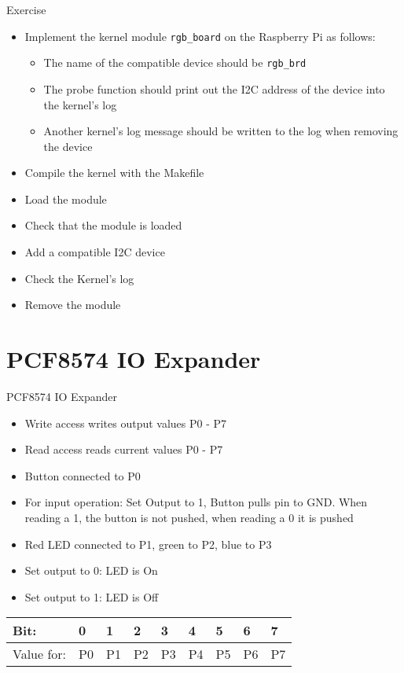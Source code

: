 \documentclass[aspectratio=169]{beamer}
\begin{document}
\begin{frame}{Exercise}
	\begin{itemize}	
		\item Implement the kernel module \lstinline|rgb_board| on the Raspberry Pi as follows:
			\begin{itemize}
				\item The name of the compatible device should be \lstinline|rgb_brd|
				\item The probe function should print out the I2C address of the device into the kernel's log
				\item Another kernel's log message should be written to the log when removing the device
			\end{itemize}
		\item Compile the kernel with the Makefile
		\item Load the module
		\item Check that the module is loaded
		\item Add a compatible I2C device
		\item Check the Kernel's log
		\item Remove the module
	\end{itemize}	
\end{frame}

\section{PCF8574 IO Expander}
\begin{frame}{PCF8574 IO Expander}
	\begin{itemize}
		\item Write access writes output values P0 - P7
		\item Read access reads current values P0 - P7
		\item Button connected to P0
		\item For input operation: Set Output to 1, Button pulls pin to GND. When reading a 1, the button is not pushed, when reading a 0 it is pushed
		\item Red LED connected to P1, green to P2, blue to P3
		\item Set output to 0: LED is On
		\item Set output to 1: LED is Off
	\end{itemize}

	\centering

	\begin{tabular}{lllllllll}
		Bit: & 0 & 1& 2& 3& 4& 5& 6& 7\\
		\hline
		Value for: & P0 & P1 & P2 & P3 & P4 & P5 &P6 & P7 \\
	\end{tabular}
\end{frame}
\end{document}
